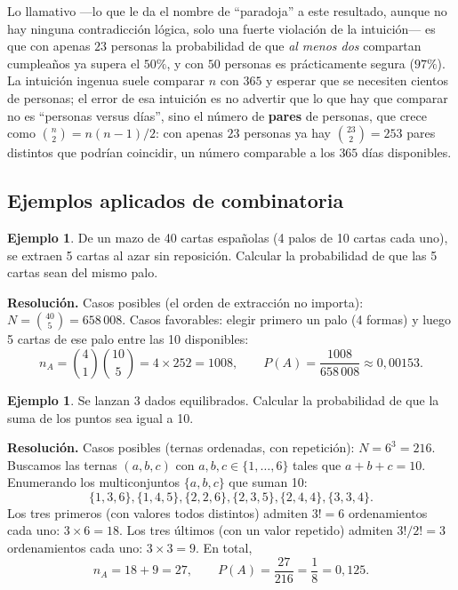 \documentclass[11pt,a4paper]{article}
\theoremstyle{plain}
\theoremstyle{definition}
\newtheorem{ejemplo}[teorema]{Ejemplo}
\theoremstyle{remark}
\begin{document}
Lo llamativo —lo que le da el nombre de ``paradoja'' a este resultado, aunque no hay ninguna contradicción lógica, solo una fuerte violación de la intuición— es que con apenas $23$ personas la probabilidad de que \emph{al menos dos} compartan cumpleaños ya supera el $50\%$, y con $50$ personas es prácticamente segura ($97\%$). La intuición ingenua suele comparar $n$ con $365$ y esperar que se necesiten cientos de personas; el error de esa intuición es no advertir que lo que hay que comparar no es ``personas versus días'', sino el número de \textbf{pares} de personas, que crece como $\binom{n}{2}=n(n-1)/2$: con apenas $23$ personas ya hay $\binom{23}{2}=253$ pares distintos que podrían coincidir, un número comparable a los $365$ días disponibles.

\subsection{Ejemplos aplicados de combinatoria}

\begin{ejemplo}
De un mazo de 40 cartas españolas (4 palos de 10 cartas cada uno), se extraen 5 cartas al azar sin reposición. Calcular la probabilidad de que las 5 cartas sean del mismo palo.
\end{ejemplo}

\textbf{Resolución.} Casos posibles (el orden de extracción no importa): $N = \binom{40}{5} = 658\,008$. Casos favorables: elegir primero un palo (4 formas) y luego 5 cartas de ese palo entre las 10 disponibles:
\[
n_A = \binom{4}{1}\binom{10}{5} = 4 \times 252 = 1008, \qquad P(A) = \frac{1008}{658\,008} \approx 0{,}00153.
\]

\begin{ejemplo}
Se lanzan 3 dados equilibrados. Calcular la probabilidad de que la suma de los puntos sea igual a 10.
\end{ejemplo}

\textbf{Resolución.} Casos posibles (ternas ordenadas, con repetición): $N = 6^3 = 216$. Buscamos las ternas $(a,b,c)$ con $a,b,c\in\{1,\dots,6\}$ tales que $a+b+c=10$. Enumerando los multiconjuntos $\{a,b,c\}$ que suman 10:
\[
\{1,3,6\}, \{1,4,5\}, \{2,2,6\}, \{2,3,5\}, \{2,4,4\}, \{3,3,4\}.
\]
Los tres primeros (con valores todos distintos) admiten $3!=6$ ordenamientos cada uno: $3\times 6=18$. Los tres últimos (con un valor repetido) admiten $3!/2!=3$ ordenamientos cada uno: $3\times 3=9$. En total,
\[
n_A = 18+9=27, \qquad P(A) = \frac{27}{216} = \frac{1}{8} = 0{,}125.
\]
\end{document}
